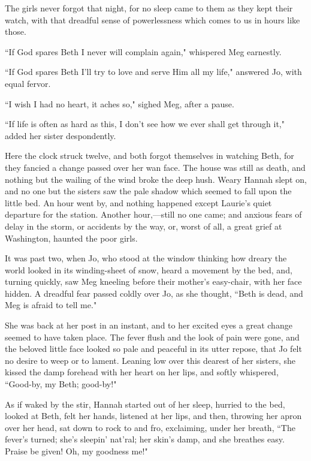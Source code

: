 The girls never forgot that night, for no sleep came to them as they
kept their watch, with that dreadful sense of powerlessness which comes
to us in hours like those.

``If God spares Beth I never will complain again," whispered Meg
earnestly.

``If God spares Beth I'll try to love and serve Him all
my life," answered Jo, with equal fervor.

``I wish I had no heart, it aches so," sighed Meg, after a pause.

``If life is often as hard as this, I don't see how we
ever shall get through it," added her sister despondently.

Here the clock struck twelve, and both forgot themselves in watching
Beth, for they fancied a change passed over her wan face. The house was
still as death, and nothing but the wailing of the wind broke the deep
hush. Weary Hannah slept on, and no one but the sisters saw the pale
shadow which seemed to fall upon the little bed. An hour went by, and
nothing happened except Laurie's quiet departure for the
station. Another hour,---still no one came; and anxious fears of delay
in the storm, or accidents by the way, or, worst of all, a great grief
at Washington, haunted the poor girls.

It was past two, when Jo, who stood at the window thinking how dreary
the world looked in its winding-sheet of snow, heard a movement by the
bed, and, turning quickly, saw Meg kneeling before their
mother's easy-chair, with her face hidden. A dreadful
fear passed coldly over Jo, as she thought, ``Beth is dead, and Meg is
afraid to tell me."

She was back at her post in an instant, and to her excited eyes a great
change seemed to have taken place. The fever flush and the look of pain
were gone, and the beloved little face looked so pale and peaceful in
its utter repose, that Jo felt no desire to weep or to lament. Leaning
low over this dearest of her sisters, she kissed the damp forehead with
her heart on her lips, and softly whispered, ``Good-by, my Beth;
good-by!"

As if waked by the stir, Hannah started out of her sleep, hurried to the
bed, looked at Beth, felt her hands, listened at her lips, and then,
throwing her apron over her head, sat down to rock to and fro,
exclaiming, under her breath, ``The fever's turned;
she's sleepin' nat'ral;
her skin's damp, and she breathes easy. Praise be given!
Oh, my goodness me!"

